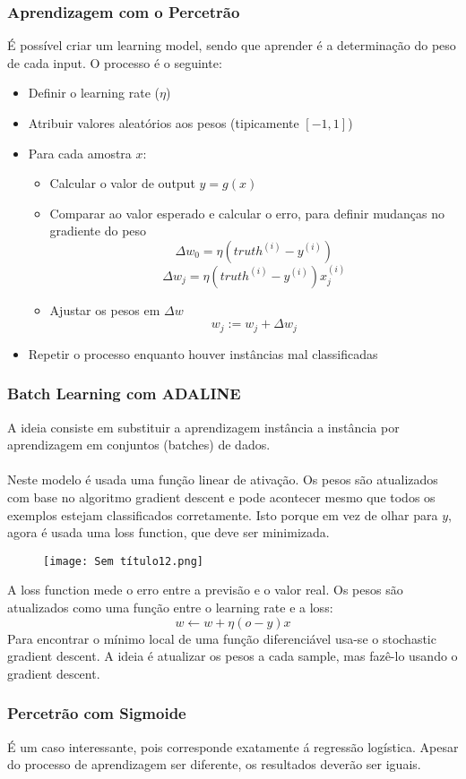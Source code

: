 \documentclass[10pt,a4paper]{report}
\begin{document}
\subsubsection{Aprendizagem com o Percetrão}
É possível criar um learning model, sendo que aprender é a determinação do peso de cada input. O processo é o seguinte:
\begin{itemize}
\item Definir o learning rate ($\eta$)
\item Atribuir valores aleatórios aos pesos (tipicamente $[-1,1]$)
\item Para cada amostra $x$:
\begin{itemize}
\item Calcular o valor de output $y = g(x)$
\item Comparar ao valor esperado e calcular o erro, para definir mudanças no gradiente do peso
$$
\Delta w_0 = \eta(truth^{(i)} - y^{(i)})
$$
$$
\Delta w_j = \eta(truth^{(i)} - y^{(i)})x_j^{(i)}
$$
\item Ajustar os pesos em $\Delta w$
$$
w_j := w_j + \Delta w_j
$$
\end{itemize}
\item Repetir o processo enquanto houver instâncias mal classificadas
\end{itemize}
\subsubsection{Batch Learning com ADALINE}
A ideia consiste em substituir a aprendizagem instância a instância por aprendizagem em conjuntos (batches) de dados.\\
\\
Neste modelo é usada uma função linear de ativação. Os pesos são atualizados com base no algoritmo gradient descent e pode acontecer mesmo que todos os exemplos estejam classificados corretamente. Isto porque em vez de olhar para $y$, agora é usada uma loss function, que deve ser minimizada.
\begin{figure}[H]
\centering
\texttt{[image: Sem título12.png]}
\end{figure}
A loss function mede o erro entre a previsão e o valor real. Os pesos são atualizados como uma função entre o learning rate e a loss:
$$
w \leftarrow w + \eta(o - y)x
$$
Para encontrar o mínimo local de uma função diferenciável usa-se o stochastic gradient descent. A ideia é atualizar os pesos a cada sample, mas fazê-lo usando o gradient descent.
\subsubsection{Percetrão com Sigmoide}
É um caso interessante, pois corresponde exatamente á regressão logística. Apesar do processo de aprendizagem ser diferente, os resultados deverão ser iguais.
\end{document}
